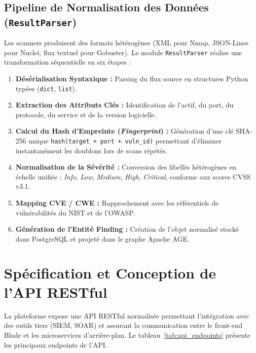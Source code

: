 \subsection{Pipeline de Normalisation des Donn\'ees (\texttt{ResultParser})}
\par Les scanners produisent des formats h\'et\'erog\`enes (XML pour Nmap, JSON-Lines pour Nuclei, flux textuel pour Gobuster). Le module \texttt{ResultParser} r\'ealise une transformation s\'equentielle en six \'etapes :
\begin{enumerate}
    \item \textbf{D\'es\'erialisation Syntaxique :} Parsing du flux source en structures Python typ\'ees (\texttt{dict}, \texttt{list}).
    \item \textbf{Extraction des Attributs Cl\'es :} Identification de l'actif, du port, du protocole, du service et de la version logicielle.
    \item \textbf{Calcul du Hash d'Empreinte (\textit{Fingerprint}) :} G\'en\'eration d'une cl\'e SHA-256 unique \texttt{hash(target + port + vuln\_id)} permettant d'\'eliminer instantan\'ement les doublons lors de scans r\'ep\'et\'es.
    \item \textbf{Normalisation de la S\'ev\'erit\'e :} Conversion des libell\'es h\'et\'erog\`enes en \'echelle unifi\'ee : \textit{Info}, \textit{Low}, \textit{Medium}, \textit{High}, \textit{Critical}, conforme aux scores CVSS v3.1.
    \item \textbf{Mapping CVE / CWE :} Rapprochement avec les r\'ef\'erentiels de vuln\'erabilit\'es du NIST et de l'OWASP.
    \item \textbf{G\'en\'eration de l'Entit\'e Finding :} Cr\'eation de l'objet normalis\'e stock\'e dans PostgreSQL et projet\'e dans le graphe Apache AGE.
\end{enumerate}

\section{Sp\'ecification et Conception de l'API RESTful}
\par La plateforme expose une API RESTful normalis\'ee permettant l'int\'egration avec des outils tiers (SIEM, SOAR) et assurant la communication entre le front-end Blade et les microservices d'arri\`ere-plan. Le tableau~\ref{tab:api_endpoints} pr\'esente les principaux endpoints de l'API.

